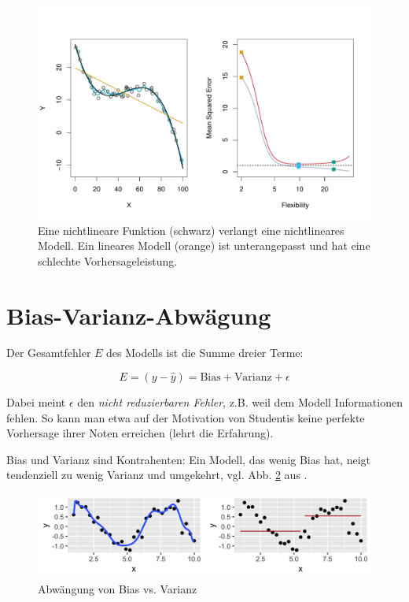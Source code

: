 \documentclass[
]{book}
\begin{document}
\begin{figure}[H]

{\centering \includegraphics[width=0.7\linewidth]{img/2-11} 

}

\caption{Eine nichtlineare Funktion (schwarz) verlangt eine nichtlineares Modell. Ein lineares Modell (orange) ist unterangepasst und hat eine schlechte Vorhersageleistung.}\label{fig:2-11}
\end{figure}

\hypertarget{bias-varianz-abwuxe4gung}{%
\section{Bias-Varianz-Abwägung}\label{bias-varianz-abwuxe4gung}}

Der Gesamtfehler \(E\) des Modells ist die Summe dreier Terme:

\[E = (y - \hat{y}) = \text{Bias} + \text{Varianz} + \epsilon\]

Dabei meint \(\epsilon\) den \emph{nicht reduzierbaren Fehler}, z.B. weil dem Modell Informationen fehlen. So kann man etwa auf der Motivation von Studentis keine perfekte Vorhersage ihrer Noten erreichen (lehrt die Erfahrung).

Bias und Varianz sind Kontrahenten: Ein Modell, das wenig Bias hat, neigt tendenziell zu wenig Varianz und umgekehrt, vgl. Abb. \ref{fig:bias-var} aus \citep{modar}.

\begin{figure}[H]

{\centering \includegraphics[width=0.7\linewidth]{img/plot-bias-variance-1} 

}

\caption{Abwängung von Bias vs. Varianz}\label{fig:bias-var}
\end{figure}

  
\end{document}
